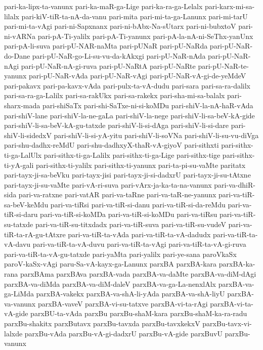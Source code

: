 {pari-ka-lipx-ta-vanunx
pari-ka-maR-ga-Lige
pari-ka-ra-ga-Lelalx
pari-karx-mi-sa-lilalx
pari-kiV-tiR-ta-nA-da-vanu
pari-mita
pari-mi-ta-ga-Lanunx
pari-mi-tarU
pari-mi-ta-vAgi
pari-ni-Sapxnanx
pari-ni-bAbx-Na-sUtarx
pari-ni-bubxtoV
pari-ni-vARNa
pari-pA-Ti-yalilx
pari-pA-Ti-yanunx
pari-pA-la-nA-ni-SeThx-yanUnx
pari-pA-li-suva
pari-pU-NAR-naMta
pari-pUNaR
pari-pU-NaRda
pari-pU-NaR-do-Dane
pari-pU-NaR-go-Li-su-vu-da-kAkxgi
pari-pU-NaR-nAda
pari-pU-NaR-nAgi
pari-pU-NaR-nA-gi-ruva
pari-pU-NaRtA
pari-pU-NaRte
pari-pU-NaR-te-yanunx
pari-pU-NaR-vAda
pari-pU-NaR-vAgi
pari-pU-NaR-vA-gi-de-yeMdeV
pari-pakavx
pari-pa-kavx-vAda
pari-pulx-ta-vA-dudu
pari-sara
pari-sa-ra-dalilx
pari-sa-ra-ga-Lalilx
pari-sa-rakUkx
pari-sa-rakekx
pari-sha-mi-sa-balalx
pari-sharx-mada
pari-shiSaTx
pari-shi-SaTxe-ni-si-koMDu
pari-shiV-la-nA-haR-vAda
pari-shiV-lane
pari-shiV-la-ne-gaLa
pari-shiV-la-nege
pari-shiV-li-sa-beV-kA-gide
pari-shiV-li-sa-beV-kA-gu-tatxde
pari-shiV-li-si-dAga
pari-shiV-li-si-dare
pari-shiV-li-sidedxV
pari-shiV-li-si-yA-yitu
pari-shiV-li-soVNa
pari-shiV-li-su-vu-diVga
pari-shu-dadhx-reMdU
pari-shu-dadhxyX-thaR-vA-giyoV
pari-sithxti
pari-sithx-ti-ga-LalUlx
pari-sithx-ti-ga-Lalilx
pari-sithx-ti-ga-Lige
pari-sithx-tige
pari-sithx-ti-yA-gali
pari-sithx-ti-yalilx
pari-sithx-ti-yanunx
pari-ta-pi-su-vaMte
paritatx
pari-tayx-ji-sa-beVku
pari-tayx-jisi
pari-tayx-ji-si-dadxrU
pari-tayx-ji-su-tAtxne
pari-tayx-ji-su-vaMte
pari-vA-ri-suva
pari-vArx-ja-ka-ta-na-vanunx
pari-va-dhiR-sida
pari-va-ratxne
pari-vatAR
pari-va-taRne
pari-va-taR-ne-yanunx
pari-va-tiR-sa-beV-keMdu
pari-va-tiRsi
pari-va-tiR-si-danu
pari-va-tiR-si-da-reMdu
pari-va-tiR-si-daru
pari-va-tiR-si-koMDa
pari-va-tiR-si-koMDu
pari-va-tiRsu
pari-va-tiR-su-tatxde
pari-va-tiR-su-titxdadx
pari-va-tiR-suva
pari-va-tiR-su-vudeV
pari-va-tiR-ta-rA-gu-tAtxre
pari-va-tiR-ta-vAda
pari-va-tiR-ta-vA-dadudx
pari-va-tiR-ta-vA-davu
pari-va-tiR-ta-vA-duvu
pari-va-tiR-ta-vAgi
pari-va-tiR-ta-vA-gi-ruva
pari-va-tiR-ta-vA-gu-tatxde
pari-yaMta
pari-yalilx
pari-ye-sana
paroVkaSx
paroV-kaSx-vAgi
paru-Sa-vA-kayx-ga-Lanunx
parxBA
parxBA-kara
parxBA-ka-rana
parxBAma
parxBAva
parxBA-vada
parxBA-va-daMte
parxBA-va-diM-dAgi
parxBA-va-diMda
parxBA-va-diM-daleV
parxBA-va-ga-La-nenxlAlx
parxBA-va-ga-LiMda
parxBA-vakekx
parxBA-va-shA-li-yAda
parxBA-va-shA-liyU
parxBA-va-vanunx
parxBA-vaveV
parxBA-vi-su-tatxve
parxBA-vi-ta-rAgi
parxBA-vi-ta-vA-gide
parxBU-ta-vAda
parxBu
parxBu-shaM-kara
parxBu-shaM-ka-ra-radu
parxBu-shakitx
parxButavx
parxBu-tavxda
parxBu-tavxkekxV
parxBu-tavx-vi-lalxde
parxBu-vAda
parxBu-vA-gi-dadxrU
parxBu-vA-gide
parxBuvU
parxBu-vanunx
}
